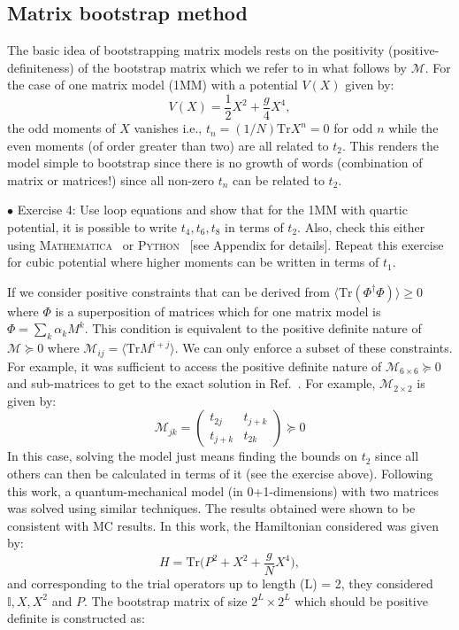 \documentclass[letter,11pt]{article}
\newcommand{\MA}{\textsc{Mathematica}}
\newcommand{\PY}{\textsc{Python}}
\begin{document}
\subsection{Matrix bootstrap method}
The basic idea of bootstrapping matrix models rests on the 
positivity (positive-definiteness) of the bootstrap matrix which we refer to in what follows 
by $\mathcal{M}$. For the case of one matrix model (1MM) with a potential $V(X)$ given by: 
\begin{equation}
    V(X) = \frac12 X^2 + \frac{g}{4} X^4, 
\end{equation}
the odd moments of $X$ vanishes i.e., $ t_{n} = (1/N)\mbox{Tr} X^n = 0$ for odd $n$
while the even moments (of order greater than two) are all related to $t_{2}$. This renders the 
model simple to bootstrap since there is no growth of words (combination of matrix or matrices!)
since all non-zero $t_{n}$ can be related to $t_{2}$. 
\begin{mdframed}[backgroundcolor=blue!3] 
	$\bullet$ Exercise 4: Use loop equations and show that for the 1MM with quartic potential, it is possible to write $t_{4}, t_{6}, t_{8}$ in terms of $t_{2}$. Also, check this either using \MA~ or \PY~ [see Appendix for details]. 
Repeat this exercise for cubic potential where higher moments can be written in terms of $t_1$.  
\end{mdframed} 
If we consider positive constraints that can be derived from $\langle \mbox{Tr}(\Phi^{\dagger}\Phi) \rangle \ge 0 $
where $\Phi$ is a superposition of matrices which for one matrix model is 
$ \Phi = \sum_{k} \alpha_{k} M^{k}$. This condition is equivalent to the positive definite nature of
$\mathcal{M} \succeq 0 $ where $ \mathcal{M}_{ij} = \langle \mbox{Tr} M^{i+j} \rangle$. 
We can only enforce a subset of these constraints. For example, it was sufficient to 
access the positive definite nature of $\mathcal{M}_{6 \times 6} \succeq 0 $ 
and sub-matrices to get to the exact solution in Ref.~\cite{Lin:2020mme}. 
For example, $\mathcal{M}_{2 \times 2}$ is given by:
\begin{equation}
	\mathcal{M}_{jk} = 
	\begin{pmatrix}
		t_{2j} & t_{j+k}  \\
		t_{j+k} & t_{2k}  
	\end{pmatrix}  \succeq 0
\end{equation}
In this case, solving the model just means finding the bounds on $t_{2}$ 
since all others can then be calculated in terms of it (see the exercise above). 
Following this work, a quantum-mechanical 
model (in 0+1-dimensions) with two matrices was solved using similar techniques. 
The results obtained were shown to be consistent with MC results. 
In this work, the Hamiltonian considered was given by:
\begin{equation}
H = \mbox{Tr} \Big( P^2 + X^2 + \frac{g}{N} X^4 \Big),
\end{equation}
and corresponding to the trial operators up to length (L) = 2, 
they considered $ \mathbb{I}, X, X^{2}$ and $P$. The bootstrap matrix
of size $2^L \times 2^L$ which should be positive definite is constructed as:
\end{document}
